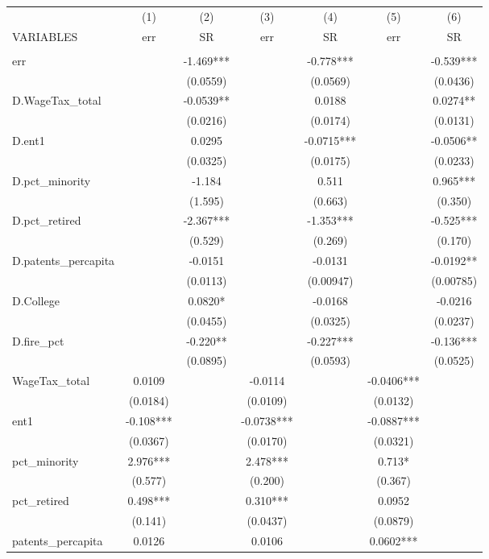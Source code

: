 \begin{tabular}{lcccccc} \hline
 & (1) & (2) & (3) & (4) & (5) & (6) \\
VARIABLES & err & SR & err & SR & err & SR \\ \hline
 &  &  &  &  &  &  \\
err &  & -1.469*** &  & -0.778*** &  & -0.539*** \\
 &  & (0.0559) &  & (0.0569) &  & (0.0436) \\
D.WageTax\_total &  & -0.0539** &  & 0.0188 &  & 0.0274** \\
 &  & (0.0216) &  & (0.0174) &  & (0.0131) \\
D.ent1 &  & 0.0295 &  & -0.0715*** &  & -0.0506** \\
 &  & (0.0325) &  & (0.0175) &  & (0.0233) \\
D.pct\_minority &  & -1.184 &  & 0.511 &  & 0.965*** \\
 &  & (1.595) &  & (0.663) &  & (0.350) \\
D.pct\_retired &  & -2.367*** &  & -1.353*** &  & -0.525*** \\
 &  & (0.529) &  & (0.269) &  & (0.170) \\
D.patents\_percapita &  & -0.0151 &  & -0.0131 &  & -0.0192** \\
 &  & (0.0113) &  & (0.00947) &  & (0.00785) \\
D.College &  & 0.0820* &  & -0.0168 &  & -0.0216 \\
 &  & (0.0455) &  & (0.0325) &  & (0.0237) \\
D.fire\_pct &  & -0.220** &  & -0.227*** &  & -0.136*** \\
 &  & (0.0895) &  & (0.0593) &  & (0.0525) \\
WageTax\_total & 0.0109 &  & -0.0114 &  & -0.0406*** &  \\
 & (0.0184) &  & (0.0109) &  & (0.0132) &  \\
ent1 & -0.108*** &  & -0.0738*** &  & -0.0887*** &  \\
 & (0.0367) &  & (0.0170) &  & (0.0321) &  \\
pct\_minority & 2.976*** &  & 2.478*** &  & 0.713* &  \\
 & (0.577) &  & (0.200) &  & (0.367) &  \\
pct\_retired & 0.498*** &  & 0.310*** &  & 0.0952 &  \\
 & (0.141) &  & (0.0437) &  & (0.0879) &  \\
patents\_percapita & 0.0126 &  & 0.0106 &  & 0.0602*** &  \\

\end{tabular}
